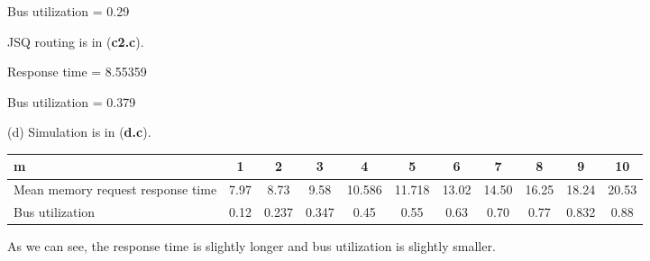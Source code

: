 \documentclass[12pt,fleqn]{article}
\begin{document}
  \item Bus utilization = 0.29
  \ei


  JSQ routing is in (\textbf{c2.c}).


  \bi
  \item Response time = 8.55359

  \item Bus utilization = 0.379
  \ei

  \item[(d)] Simulation is in (\textbf{d.c}).
  \begin{center}
    \begin{tabular}{ |p{3cm}|c|c|c|c|c|c|c|c|c|c| }
      \hline
      m & 1 & 2 & 3 & 4 & 5 & 6 & 7 & 8 & 9 & 10 \\
      \hline
      Mean memory request response time & 7.97 & 8.73 & 9.58 & 10.586 & 11.718 & 13.02 & 14.50 & 16.25 & 18.24 & 20.53 \\
      \hline
      Bus utilization & 0.12 & 0.237 & 0.347 & 0.45 & 0.55 & 0.63 & 0.70 & 0.77 & 0.832 & 0.88 \\
      \hline
    \end{tabular}
  \end{center}

  As we can see, the response time is slightly longer and bus utilization is slightly smaller.



  \ee
\end{document}
